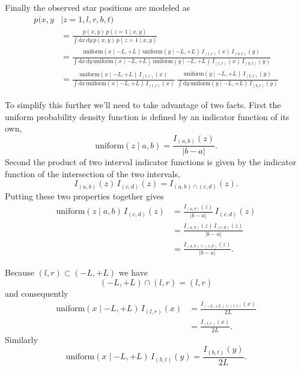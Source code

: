 \documentclass[
  letterpaper,
  DIV=11,
  numbers=noendperiod]{scrartcl}
\begin{document}
Finally the observed star positions are modeled as \begin{align*}
p(x, y &\mid z = 1, l, r, b, t)
\\
&=
\frac{ p(x, y) \, p(z = 1 \mid x, y) }
{ \int \mathrm{d} x \, \mathrm{d} y \, p(x, y) \, p(z = 1 \mid x, y) }
\\
&=
\frac{ \text{uniform}(x \mid -L, +L) \, \text{uniform}(y \mid -L, +L) \,
  I_{(l, r)}(x) \, I_{(b, t)}(y) }
{ \int \mathrm{d} x \, \mathrm{d} y \,
  \text{uniform}(x \mid -L, +L) \, \text{uniform}(y \mid -L, +L) \,
  I_{(l, r)}(x) \, I_{(b, t)}(y) }
\\
&=
\frac{ \text{uniform}(x \mid -L, +L) \, I_{(l, r)}(x) }
{ \int \mathrm{d} x \, \text{uniform}(x \mid -L, +L) \, I_{(l, r)}(x) } \,
\frac{ \text{uniform}(y \mid -L, +L) \, I_{(b, t)}(y) }
{ \int \mathrm{d} y \, \text{uniform}(y \mid -L, +L) \, I_{(b, t)}(y) }
\end{align*}

To simplify this further we'll need to take advantage of two facts.
First the uniform probability density function is defined by an
indicator function of its own, \[
\text{uniform}(z \mid a, b) = \frac{ I_{(a, b)}(z) }{ | b - a | }.
\] Second the product of two interval indicator functions is given by
the indicator function of the intersection of the two intervals, \[
I_{(a, b)}(z) \, I_{(c, d)}(z) = I_{(a, b) \cap (c, d)}(z).
\] Putting these two properties together gives \begin{align*}
\text{uniform}(z \mid a, b) \, I_{(c, d)}(z)
&=
\frac{ I_{(a, b)}(z) }{ | b - a | } \, I_{(c, d)}(z)
\\
&=
\frac{ I_{(a, b)}(z) \, I_{(c, d)}(z) }{ | b - a | }
\\
&=
\frac{ I_{(a, b) \cap (c, d)}(z) }{ | b - a | }.
\end{align*}

Because \((l, r) \subset (-L, +L)\) we have \[
(-L, +L) \cap (l, r) = (l, r)
\] and consequently \begin{align*}
\text{uniform}(x \mid -L, +L) \, I_{(l, r)}(x)
&=
\frac{ I_{(-L, +L) \cap (l, r)}(x) }{ 2 L }
\\
&=
\frac{ I_{(l, r)}(x) }{ 2 L }.
\end{align*} Similarly \[
\text{uniform}(x \mid -L, +L) \, I_{(b, t)}(y) = \frac{ I_{(b, t)}(y) }{ 2 L }.
\]
\end{document}
